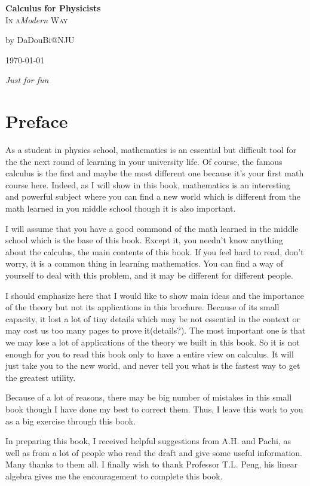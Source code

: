 \documentclass[11pt,a4paper,openany]{book}%
\theoremstyle{plain}%
\begin{document}
\addtocounter{chapter}{-1}
\frontmatter
\thispagestyle{empty}
\begin{flushright}
{\Huge\bfseries Calculus for Physicists}\\[\baselineskip]
{{\scshape In a\:}\Large {\itshape Modern} {\scshape Way}} \par
{by DaDouBi@NJU}\par
\today
\end{flushright}
\vfill
{\Large\itshape Just for fun}
\clearpage
\chapter*{Preface}
As a student in physics school, mathematics is an essential but difficult tool for the the next round of learning in your university life. Of course, the famous calculus is the first  and maybe the most different one because it's your first math course here. Indeed, as I will show in this book, mathematics is an interesting and powerful subject where you can find a new world which is different from the math learned in you middle school though it is also important.

I will assume that you have a good commond of the math learned in the middle school which is the base of this book. Except it, you needn't know anything about the calculus, the main contents of this book. If you feel hard to read, don't worry, it is a common thing in learning mathematics. You can find a way of yourself to deal with this problem, and it may be different for different people.

I should emphasize here that I would like to show main ideas and the importance of the theory but not its applications in this brochure. Because of its small capacity, it lost a lot of tiny details which may be not essential in the context or may cost us too many pages to prove it(details?). The most important one is that we may lose a lot of applications of the theory we built in this book. So it is not enough for you to read this book only to have a entire view on calculus. It will just take you to the new world, and never tell you what is the fastest way to get the greatest utility.

Because of a lot of reasons, there may be big number of mistakes in this small book though I have done my best to correct them. Thus, I leave this work to you as a big exercise through this book.

In preparing this book, I received helpful suggestions from A.H. and Pachi, as well as from a lot of people who read the draft and give some useful information. Many thanks to them all. I finally wish to thank Professor T.L. Peng, his linear algebra gives me the encouragement to complete this book.
\end{document}
